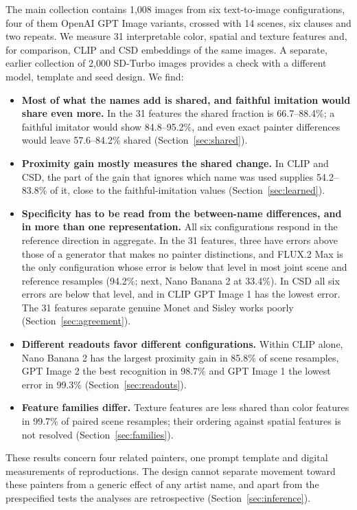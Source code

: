 \documentclass[10pt]{article}
\begin{document}
The main collection contains 1,008 images from six text-to-image configurations, four of them
OpenAI GPT Image variants, crossed with 14 scenes, six clauses and two repeats. We measure 31
interpretable color, spatial and texture features and, for comparison, CLIP \citep{radford2021}
and CSD \citep{somepalli2024style} embeddings of the same images. A separate, earlier
collection of 2,000 SD-Turbo images provides a check with a different model, template and seed
design. We find:
\begin{itemize}
\item \textbf{Most of what the names add is shared, and faithful imitation would share even
more.} In the 31 features the shared fraction is 66.7--88.4\%; a faithful imitator would show
84.8--95.2\%, and even exact painter differences would leave 57.6--84.2\% shared
(Section~\ref{sec:shared}).
\item \textbf{Proximity gain mostly measures the shared change.} In CLIP and CSD, the part of the
gain that ignores which name was used supplies 54.2--83.8\% of it, close to the faithful-imitation
values (Section~\ref{sec:learned}).
\item \textbf{Specificity has to be read from the between-name differences, and in more than one
representation.} All six configurations respond in the reference direction in aggregate. In the
31 features, three have errors above those of a generator that makes no painter distinctions, and
FLUX.2 Max is the only configuration whose error is below that level in most joint scene and
reference resamples (94.2\%; next, Nano Banana 2 at 33.4\%). In CSD all six errors are below that
level, and in CLIP GPT Image 1 has the lowest error. The 31 features separate genuine Monet and
Sisley works poorly (Section~\ref{sec:agreement}).
\item \textbf{Different readouts favor different configurations.} Within CLIP alone, Nano Banana 2
has the largest proximity gain in 85.8\% of scene resamples, GPT Image 2 the best recognition in
98.7\% and GPT Image 1 the lowest error in 99.3\% (Section~\ref{sec:readouts}).
\item \textbf{Feature families differ.} Texture features are less shared than color features in
99.7\% of paired scene resamples; their ordering against spatial features is not resolved
(Section~\ref{sec:families}).
\end{itemize}

These results concern four related painters, one prompt template and digital measurements of
reproductions. The design cannot separate movement toward these painters from a generic effect
of any artist name, and apart from the prespecified tests the analyses are retrospective
(Section~\ref{sec:inference}).
\end{document}
